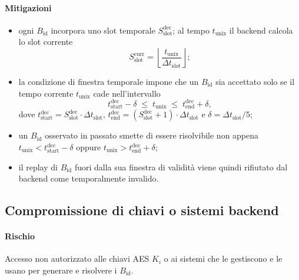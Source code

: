 \documentclass[a4paper,11pt]{article}
\begin{document}
\paragraph{Mitigazioni}
\begin{itemize}
  \item ogni \(B_{\text{id}}\) incorpora uno slot temporale \(S_{\text{slot}}^{\text{dec}}\); al tempo
        \(t_{\text{unix}}\) il backend calcola lo slot corrente
        \[
          S_{\text{slot}}^{\text{curr}}
          = \left\lfloor \frac{t_{\text{unix}}}{\Delta t_{\text{slot}}} \right\rfloor;
        \]
  \item la condizione di finestra temporale impone che un \(B_{\text{id}}\) sia accettato solo se
        il tempo corrente \(t_{\text{unix}}\) cade nell'intervallo
        \[
          t_{\text{start}}^{\text{dec}} - \delta
          \;\le\;
          t_{\text{unix}}
          \;\le\;
          t_{\text{end}}^{\text{dec}} + \delta,
        \]
        dove
        \(t_{\text{start}}^{\text{dec}} =
        S_{\text{slot}}^{\text{dec}} \cdot \Delta t_{\text{slot}}\),
        \(t_{\text{end}}^{\text{dec}} =
        (S_{\text{slot}}^{\text{dec}} + 1) \cdot \Delta t_{\text{slot}}\)
        e \(\delta = \Delta t_{\text{slot}}/5\);
  \item un \(B_{\text{id}}\) osservato in passato smette di essere risolvibile non appena
        \(t_{\text{unix}} < t_{\text{start}}^{\text{dec}} - \delta\) oppure
        \(t_{\text{unix}} > t_{\text{end}}^{\text{dec}} + \delta\);

  \item il replay di \(B_{\text{id}}\) fuori dalla sua finestra di validità viene quindi rifiutato
        dal backend come temporalmente invalido.
\end{itemize}

\subsection{Compromissione di chiavi o sistemi backend}
\paragraph{Rischio}
Accesso non autorizzato alle chiavi AES \(K_i\) o ai sistemi che le gestiscono e le usano per
generare e risolvere i \(B_{\text{id}}\).
\end{document}
